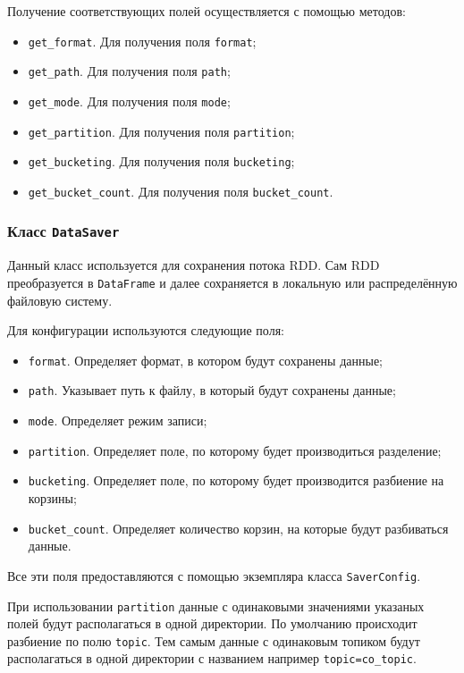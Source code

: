 Получение соответствующих полей осуществляется с помощью методов:
\begin{itemize}
    \item \texttt{get\_format}. Для получения поля \texttt{format};
    \item \texttt{get\_path}. Для получения поля \texttt{path};
    \item \texttt{get\_mode}. Для получения поля \texttt{mode};
    \item \texttt{get\_partition}. Для получения поля \texttt{partition};
    \item \texttt{get\_bucketing}. Для получения поля \texttt{bucketing};
    \item \texttt{get\_bucket\_count}. Для получения поля \texttt{bucket\_count}.
\end{itemize}

\subsubsection{Класс \texttt{DataSaver}}
Данный класс используется для сохранения потока RDD.
Сам RDD преобразуется в \texttt{DataFrame} и далее сохраняется в локальную или распределённую файловую систему.

Для конфигурации используются следующие поля:
\begin{itemize}
    \item \texttt{format}. Определяет формат, в котором будут сохранены данные;
    \item \texttt{path}. Указывает путь к файлу, в который будут сохранены данные;
    \item \texttt{mode}. Определяет режим записи;
    \item \texttt{partition}. Определяет поле, по которому будет производиться разделение;
    \item \texttt{bucketing}. Определяет поле, по которому будет производится разбиение на корзины;
    \item \texttt{bucket\_count}. Определяет количество корзин, на которые будут разбиваться данные.
\end{itemize}

Все эти поля предоставляются с помощью экземпляра класса \texttt{SaverConfig}.

При использовании \texttt{partition} данные с одинаковыми значениями указаных полей будут располагаться в одной директории.
По умолчанию происходит разбиение по полю \texttt{topic}.
Тем самым данные с одинаковым топиком будут располагаться в одной директории с названием например \texttt{topic=co\_topic}.

